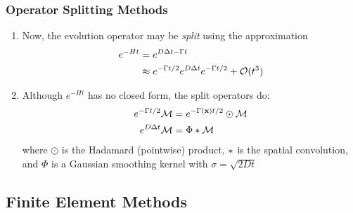 \begin{frame}
\frametitle{Operator Splitting Methods}
\begin{enumerate}
    \item Now, the evolution operator may be \textit{split} using the approximation %
    \begin{align*}
        e^{-Ht} &= e^{D \Delta t - \Gamma t} \\
        &\approx e^{-\Gamma t/2} e^{D \Delta t} e^{-\Gamma t/2} + \mathcal{O}(t^3)
    \end{align*}
    \item Although $e^{-Ht}$ has no closed form, the split operators do:
    \begin{align*}
        e^{-\Gamma t/2} \mathcal{M} &= e^{-\Gamma(\mathbf{x}) t/2} \odot \mathcal{M} \\
        e^{D \Delta t} \mathcal{M} &= \Phi \ast \mathcal{M}
    \end{align*}
    where $\odot$ is the Hadamard (pointwise) product, $\ast$ is the spatial convolution, and $\Phi$ is a Gaussian smoothing kernel with $\sigma = \sqrt{2Dt}$
\end{enumerate}
\end{frame}

\subsection{Finite Element Methods}

